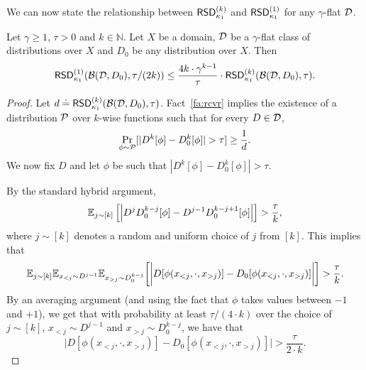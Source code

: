We can now state the relationship between $\mathsf{RSD}_{\kappa_1}^{(k)}$ and $\mathsf{RSD}_{\kappa_1}^{(1)}$ for any $\gamma$-flat $\mathcal{D}$.
\begin{lem}\label{lem:k-wise-flat-decision}
Let $\gamma \geq 1$, $\tau > 0$ and $k \in \mathbb{N}$. Let $X$ be a domain, $\mathcal{D}$ be a $\gamma$-flat class of distributions over $X$ and $D_0$ be any distribution over $X$. Then
$$\mathsf{RSD}_{\kappa_1}^{(1)}(\mathcal{B}(\mathcal{D},D_0),\tau/(2k))  \leq \frac{4k \cdot \gamma^{k-1}}{\tau} \cdot \mathsf{RSD}_{\kappa_1}^{(k)}(\mathcal{B}(\mathcal{D},D_0),\tau).$$
\end{lem}
\begin{proof}
Let $d \doteq \mathsf{RSD}_{\kappa_1}^{(k)}(\mathcal{B}(\mathcal{D},D_0),\tau)$. Fact~\ref{fa:rcvr} implies the existence of a distribution $\mathcal{P}$ over $k$-wise functions such that for every $D \in \mathcal{D}$,
$$\Pr_{\phi \sim \mathcal{P}}[|D^k[\phi]-D_0^k[\phi]| > \tau] \geq \frac{1}{d}.$$
We now fix $D$ and let $\phi$ be such that $|D^k[\phi]-D_0^k[\phi]| > \tau$. 

By the standard hybrid argument,  
\begin{equation}\label{eq:good_j}
\mathbb{E}_{j \sim [k]} \left[\left|D^{j} D_0^{k-j}[\phi]-D^{j-1}D_0^{k-j+1}[\phi]\right|\right] > \frac{\tau}{k} ,
\end{equation}
where $j \sim [k]$ denotes a random and uniform choice of $j$ from $[k]$.
This implies that
\begin{equation*}\label{eq:pull_out}
\mathbb{E}_{j \sim [k]} \mathbb E_{x_{< j} \sim D^{j-1}} \mathbb E_{x_{> j} \sim D_0^{k-j}} \bigg[\bigg|D[\phi(x_{<j}, \cdot, x_{> j})] - D_0[\phi(x_{<j}, \cdot, x_{> j})]\bigg|\bigg] > \frac{\tau}{k}.
\end{equation*}
By an averaging argument (and using the fact that $\phi$ takes values between $-1$ and $+1$), we get that with probability at least $\tau/(4 \cdot k)$ over the choice of $j\sim [k]$, $x_{< j} \sim D^{j-1}$ and $x_{> j} \sim D_0^{k-j}$, we have that
\begin{equation*}\label{eq:after_whp_switch}
\bigg|D[\phi(x_{<j}, \cdot, x_{> j})] - D_0[\phi(x_{<j}, \cdot, x_{> j})]\bigg| > \frac{\tau}{2 \cdot k}.
\end{equation*}


\end{proof}
